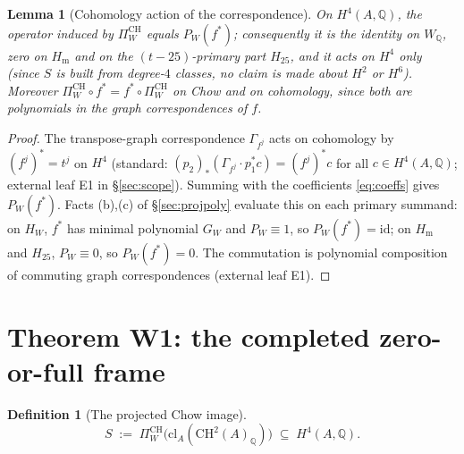 \documentclass[11pt]{article}
\newtheorem{lemma}{Lemma}
\newtheorem{definition}{Definition}
\begin{document}
\begin{lemma}[Cohomology action of the correspondence]\label{lem:action}
On $H^4(A,\mathbb{Q})$, the operator induced by $\Pi_W^{\mathrm{CH}}$ equals $P_W(f^*)$; consequently it is the
identity on $W_{\mathbb{Q}}$, zero on $H_{\mathrm{m}}$ and on the $(t-25)$-primary part $H_{25}$, and it acts on $H^4$ only
(since $S$ is built from degree-$4$ classes, no claim is made about $H^2$ or $H^6$). Moreover $\Pi_W^{\mathrm{CH}}\circ f^{*}=f^{*}\circ\Pi_W^{\mathrm{CH}}$ on Chow and
on cohomology, since both are polynomials in the graph correspondences of $f$.
\end{lemma}

\begin{proof}
The transpose-graph correspondence $\Gamma_{f^j}$ acts on cohomology by $(f^j)^{*}=t^j$ on
$H^{4}$ (standard: $(p_2)_*(\Gamma_{f^j}\cdot p_1^*c)= (f^j)^{*}c$ for all $c\in H^{4}(A,\mathbb{Q})$;
external leaf E1 in \S\ref{sec:scope}). Summing with the coefficients \eqref{eq:coeffs} gives $P_W(f^*)$.
Facts (b),(c) of \S\ref{sec:projpoly} evaluate this on each primary summand: on $H_W$, $f^*$ has minimal polynomial
$G_W$ and $P_W\equiv1$, so $P_W(f^*)=\mathrm{id}$; on $H_{\mathrm{m}}$ and $H_{25}$, $P_W\equiv 0$, so
$P_W(f^*)=0$. The commutation is polynomial composition of commuting graph correspondences
(external leaf E1).
\end{proof}

\section{Theorem W1: the completed zero-or-full frame}\label{sec:W1}

\begin{definition}[The projected Chow image]\label{def:S}
\[
S\;:=\;\Pi_W^{\mathrm{CH}}\big(\mathrm{cl}_A(\mathrm{CH}^{2}(A)_{\mathbb{Q}})\big)\;\subseteq\;H^{4}(A,\mathbb{Q}).
\]
\end{definition}
\end{document}
